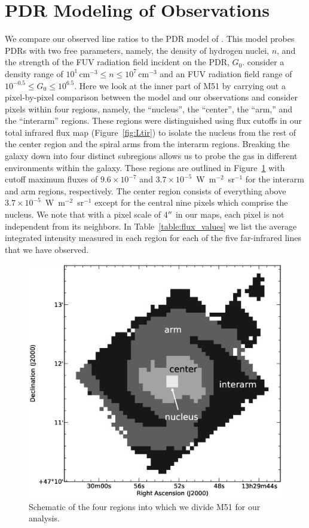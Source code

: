 \section{PDR Modeling of Observations}\label{pdr_model3}
We compare our observed line ratios to the PDR model of \citet{1999ApJ...527..795K,2006ApJ...644..283K}.  This model probes PDRs with two free parameters, namely, the density of hydrogen nuclei, $n$, and the strength of the FUV radiation field incident on the PDR, $G_{0}$.  \citet{1999ApJ...527..795K} consider a density range of $10^{1}\,\mathrm{cm}^{-3} \le n \le 10^{7}\,\mathrm{cm}^{-3}$ and an FUV radiation field range of $10^{-0.5} \le G_{0} \le 10^{6.5}$.  Here we look at the inner part of M51 by carrying out a pixel-by-pixel comparison between the model and our observations and consider pixels within four regions, namely, the ``nucleus'', the ``center'', the ``arm,'' and the ``interarm'' regions.  These regions were distinguished using flux cutoffs in our total infrared flux map (Figure~\ref{fig:Ltir}) to isolate the nucleus from the rest of the center region and the spiral arms from the interarm regions.  Breaking the galaxy down into four distinct subregions allows us to probe the gas in different environments within the galaxy.  These regions are outlined in Figure~\ref{fig:regions} with cutoff maximum fluxes of $9.6 \times 10^{-7}$ and $3.7 \times 10^{-5}$~W~m$^{-2}$~sr$^{-1}$ for the interarm and arm regions, respectively.  The center region consists of everything above $3.7 \times 10^{-5}$~W~m$^{-2}$~sr$^{-1}$ except for the central nine pixels which comprise the nucleus.  We note that with a pixel scale of 4$\mbox{$^{\prime\prime}$}$ in our maps, each pixel is not independent from its neighbors.  In Table~\ref{table:flux_values} we list the average integrated intensity measured in each region for each of the five far-infrared lines that we have observed. 

\begin{figure}
\centering
\includegraphics[width=\columnwidth]{ch3/Figure6}
\caption{Schematic of the four regions into which we divide M51 for our analysis.}
\label{fig:regions}
\end{figure}

